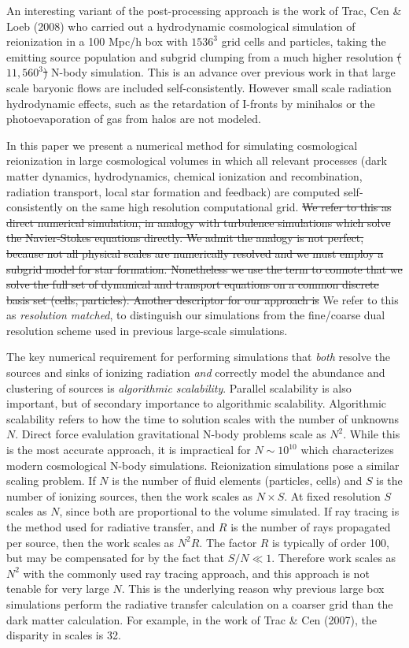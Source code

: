 An interesting variant of the post-processing approach is the work of Trac, Cen \& Loeb (2008) who carried out a hydrodynamic cosmological simulation of reionization in a 100 Mpc/h box with $1536^3$ grid cells and particles, taking the emitting source population and subgrid clumping from a much higher resolution \st{($11,560^3$)} N-body simulation. This is an advance over previous work in that large scale baryonic flows are included self-consistently. However small scale radiation hydrodynamic effects, such as the retardation of I-fronts by minihalos \citep{Shapiro04} or the photoevaporation of gas from halos are not modeled. 

In this paper we present a numerical method for simulating cosmological reionization in large cosmological volumes in which 
all relevant processes (dark matter dynamics, hydrodynamics, chemical ionization and recombination, radiation transport, local
star formation and feedback) are computed self-consistently on the same high resolution computational grid. 
\st{ We refer to this as direct numerical simulation, in analogy with turbulence simulations which solve the Navier-Stokes equations directly. We admit the analogy is not perfect, because not all physical scales are numerically resolved and we must employ a subgrid model for star formation. 
Nonetheless we use the term to connote that we solve the full set of dynamical and transport equations on a common discrete basis set (cells, particles). Another descriptor for our approach is} We refer to this as {\em resolution matched}, to distinguish our simulations from the fine/coarse dual resolution scheme used in previous large-scale simulations. 

The key numerical requirement for performing simulations that {\em both} resolve the sources and sinks of ionizing radiation {\em and} correctly model the abundance and clustering of sources is {\em algorithmic scalability}. Parallel scalability is also important, but of secondary importance to algorithmic scalability. Algorithmic scalability refers to how the time to solution scales with the number of unknowns $N$. Direct force evalulation gravitational N-body problems scale as $N^2$. While this is the most accurate approach, it is impractical for $N \sim 10^{10}$ which characterizes modern cosmological N-body simulations. Reionization simulations pose a similar scaling problem. If $N$ is the number of fluid elements (particles, cells) and $S$ is the number of ionizing sources, then the work scales as $N \times S$. At fixed resolution $S$ scales as $N$, since both are proportional to the volume simulated. If ray tracing is the method used for radiative transfer, and $R$ is the number of rays propagated per source, then the work scales as $N^2 R$. The factor $R$ is typically of order 100, but may be compensated for by the fact that $S/N \ll 1$. Therefore work scales as $N^2$ with the commonly used ray tracing approach, and this approach is not tenable for very large $N$. This is the underlying reason why previous large box simulations perform the radiative transfer calculation on a coarser grid than the dark matter calculation. For example, in the work of Trac \& Cen (2007), the disparity in scales is 32.

